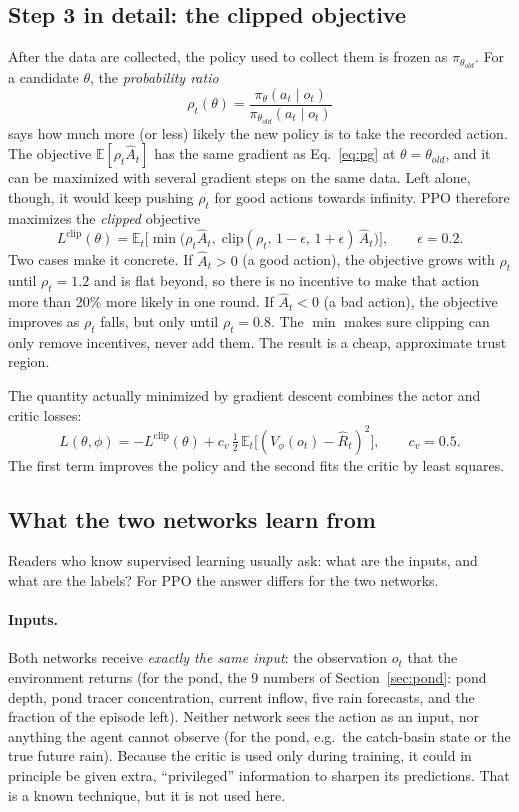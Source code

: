 \subsection{Step 3 in detail: the clipped objective}
After the data are collected, the policy used to collect them is frozen as
$\pi_{\theta_{old}}$. For a candidate $\theta$, the \emph{probability
ratio}
\[
\rho_t(\theta)=\frac{\pi_\theta(a_t\mid o_t)}{\pi_{\theta_{old}}(a_t\mid o_t)}
\]
says how much more (or less) likely the new policy is to take the recorded
action. The objective $\mathbb E[\rho_t\hat A_t]$ has the same gradient as
Eq.~\eqref{eq:pg} at $\theta=\theta_{old}$, and it can be maximized with
several gradient steps on the same data. Left alone, though, it would keep
pushing $\rho_t$ for good actions towards infinity. PPO therefore
maximizes the \emph{clipped} objective
\begin{equation}
L^{\mathrm{clip}}(\theta)=\mathbb E_t\Big[\min\big(\rho_t\hat A_t,\;\mathrm{clip}(\rho_t,\,1-\epsilon,\,1+\epsilon)\,\hat A_t\big)\Big],\qquad \epsilon=0.2 .
\label{eq:clip}
\end{equation}
Two cases make it concrete. If $\hat A_t>0$ (a good action), the objective
grows with $\rho_t$ until $\rho_t=1.2$ and is flat beyond, so there is no
incentive to make that action more than 20\% more likely in one round. If
$\hat A_t<0$ (a bad action), the objective improves as $\rho_t$ falls, but
only until $\rho_t=0.8$. The $\min$ makes sure clipping can only remove
incentives, never add them. The result is a cheap, approximate trust
region.

The quantity actually minimized by gradient descent combines the actor and
critic losses:
\begin{equation}
L(\theta,\phi)=-L^{\mathrm{clip}}(\theta)+c_v\,\tfrac12\,\mathbb E_t\big[(V_\phi(o_t)-\hat R_t)^2\big],\qquad c_v=0.5 .
\label{eq:ppo_loss}
\end{equation}
The first term improves the policy and the second fits the critic by least
squares.

\subsection{What the two networks learn from}\label{sec:ppo_data}
Readers who know supervised learning usually ask: what are the inputs, and
what are the labels? For PPO the answer differs for the two networks.

\paragraph{Inputs.} Both networks receive \emph{exactly the same input}:
the observation $o_t$ that the environment returns (for the pond, the 9
numbers of Section~\ref{sec:pond}: pond depth, pond tracer concentration,
current inflow, five rain forecasts, and the fraction of the episode left).
Neither network sees the action as an input, nor anything the agent cannot
observe (for the pond, e.g.\ the catch-basin state or the true future
rain). Because the critic is used only during training, it could in
principle be given extra, ``privileged'' information to sharpen its
predictions. That is a known technique, but it is not used here.

